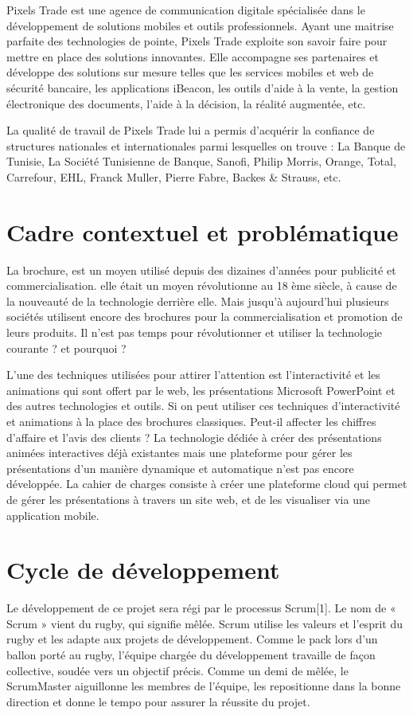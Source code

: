 \documentclass[12pt, ChapStyle1, oneside]{./Styles/Dea_Gsm}
\begin{document}
Pixels Trade est une agence de communication digitale spécialisée dans le développement de solutions mobiles et outils professionnels. Ayant une maitrise parfaite des technologies de pointe, Pixels Trade exploite son savoir faire pour mettre en place des solutions innovantes. Elle accompagne ses partenaires et développe des solutions sur mesure telles que les services mobiles et web de sécurité bancaire, les applications iBeacon, les outils d’aide à la vente, la gestion électronique des documents, l’aide à la décision, la réalité augmentée, etc.

La qualité de travail de Pixels Trade lui a permis d’acquérir la confiance de structures nationales et internationales parmi lesquelles on trouve : La Banque de Tunisie, La Société Tunisienne de Banque, Sanofi, Philip Morris, Orange, Total, Carrefour, EHL, Franck Muller, Pierre Fabre, Backes \& Strauss, etc.
\section{Cadre contextuel et problématique}

La brochure, est un moyen utilisé depuis des dizaines d’années pour publicité et commercialisation.
elle était un moyen révolutionne au 18 ème siècle, à cause de la nouveauté de la technologie derrière elle.
Mais jusqu’à aujourd’hui plusieurs sociétés utilisent encore des brochures pour la commercialisation et promotion de leurs produits. Il n’est pas temps pour révolutionner et utiliser la technologie courante ? et pourquoi ?

L’une des techniques utilisées pour attirer l’attention est l’interactivité et les animations qui sont offert par le web, les présentations Microsoft PowerPoint et des autres technologies et outils. Si on peut utiliser ces techniques d’interactivité et animations à la place des brochures classiques. Peut-il affecter les chiffres d’affaire et l’avis des clients ?
La technologie dédiée à créer des présentations animées interactives déjà existantes mais une plateforme pour gérer les présentations d’un manière dynamique et automatique n’est pas encore développée. La cahier de charges consiste à créer une plateforme cloud qui permet de gérer les présentations à travers un site web, et de les visualiser via une application mobile.

\section{Cycle de développement}
Le développement de ce projet sera régi par le processus Scrum[1]. Le nom de « Scrum » vient du rugby, qui signifie mêlée. Scrum utilise les valeurs et l’esprit du rugby et les adapte aux projets de développement. Comme le pack lors d’un ballon porté au rugby, l’équipe chargée du développement travaille de façon collective, soudée vers un objectif précis. Comme un demi de mêlée, le ScrumMaster aiguillonne les membres de l’équipe, les repositionne dans la bonne direction et donne le tempo pour assurer la réussite du projet.
\end{document}
